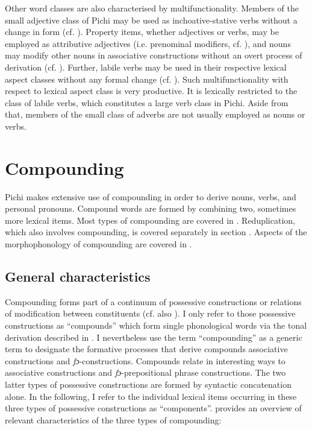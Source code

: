 Other word classes are also characterised by multifunctionality. Members of the small adjective class of Pichi may be used as inchoative-stative verbs without a change in form (cf. ). Property items, whether adjectives or verbs, may be employed as attributive adjectives (i.e. prenominal modifiers, cf. ), and nouns may modify other nouns in associative constructions without an overt process of derivation (cf. ). Further, labile verbs may be used in their respective lexical aspect classes without any formal change (cf. ). Such multifunctionality with respect to lexical aspect class is very productive. It is lexically restricted to the class of labile verbs, which constitutes a large verb class in Pichi. Aside from that, members of the small class of adverbs are not usually employed as nouns or verbs. 

\section{Compounding}\label{sec:4.4}

Pichi makes extensive use of compounding in order to derive nouns, verbs, and personal pronouns. Compound words are formed by combining two, sometimes more lexical items. Most types of compounding are covered in . Reduplication, which also involves compounding, is covered separately in section . Aspects of the morphophonology of compounding are covered in .

\subsection{General characteristics}

Compounding forms part of a continuum of possessive constructions or relations of modification between constituents (cf. also ). I only refer to those possessive constructions as “compounds” which form single phonological words via the tonal derivation described in . I nevertheless use the term “compounding” as a generic term to designate the formative processes that derive compounds associative constructions and \textit{fɔ}{}-constructions. Compounds relate in interesting ways to associative constructions and \textit{fɔ}{}-prepositional phrase constructions. The two latter types of possessive constructions are formed by syntactic concatenation alone. In the following, I refer to the individual lexical items occurring in these three types of possessive constructions as “components”.  provides an overview of relevant characteristics of the three types of compounding: 

